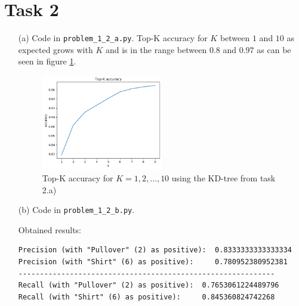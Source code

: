 \documentclass [a4paper, 11pt] {article}
\begin{document}
\section{Task 2}
\begin{enumerate}
	\item[(a)] Code in \texttt{problem\_1\_2\_a.py}. Top-K accuracy for $K$ between $1$ and $10$ as expected grows with $K$ and is in the range between $0.8$ and $0.97$ as can be seen in figure \ref{fig:2a}.
	\begin{figure}[!h]
		\centering
		\includegraphics[width=0.5\textwidth]{1_2_a.png}
		\caption{Top-K accuracy for $K = 1, 2,\dots, 10$ using the KD-tree from task 2.a)}
		\label{fig:2a}
	\end{figure}

	\item[(b)]	Code in \texttt{problem\_1\_2\_b.py}.
	
	Obtained results:
	\begin{lstlisting}[mathescape=true]
Precision (with "Pullover" (2) as positive):  0.8333333333333334
Precision (with "Shirt" (6) as positive):     0.780952380952381
------------------------------------------------------------
Recall (with "Pullover" (2) as positive):  0.7653061224489796
Recall (with "Shirt" (6) as positive):     0.845360824742268
	\end{lstlisting}
	
\end{enumerate}
	
	
	

	
\end{document}
